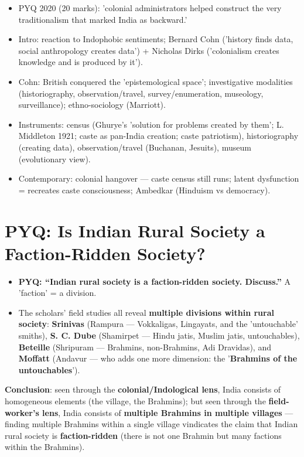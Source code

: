 \begin{QuickRevision}
\begin{itemize}
\item PYQ 2020 (20 marks): 'colonial administrators helped construct the very traditionalism that marked India as backward.'
\item Intro: reaction to Indophobic sentiments; Bernard Cohn ('history finds data, social anthropology creates data') + Nicholas Dirks ('colonialism creates knowledge and is produced by it').
\item Cohn: British conquered the 'epistemological space'; investigative modalities (historiography, observation/travel, survey/enumeration, museology, surveillance); ethno-sociology (Marriott).
\item Instruments: census (Ghurye's 'solution for problems created by them'; L. Middleton 1921; caste as pan-India creation; caste patriotism), historiography (creating data), observation/travel (Buchanan, Jesuits), museum (evolutionary view).
\item Contemporary: colonial hangover --- caste census still runs; latent dysfunction = recreates caste consciousness; Ambedkar (Hinduism vs democracy).
\end{itemize}
\end{QuickRevision}

\section{PYQ: Is Indian Rural Society a Faction-Ridden Society?}

\begin{PYQLink}
\begin{itemize}
\item \textbf{PYQ: ``Indian rural society is a faction-ridden society. Discuss.''} A 'faction' = a division.
\item The scholars' field studies all reveal \textbf{multiple divisions within rural society}: \textbf{Srinivas} (Rampura --- Vokkaligas, Lingayats, and the 'untouchable' smiths), \textbf{S. C. Dube} (Shamirpet --- Hindu jatis, Muslim jatis, untouchables), \textbf{Beteille} (Shripuram --- Brahmins, non-Brahmins, Adi Dravidas), and \textbf{Moffatt} (Andavur --- who adds one more dimension: the '\textbf{Brahmins of the untouchables}').
\end{itemize}
\end{PYQLink}

\begin{KeyConcept}
\textbf{Conclusion}: seen through the \textbf{colonial/Indological lens}, India consists of homogeneous elements (the village, the Brahmins); but seen through the \textbf{field-worker's lens}, India consists of \textbf{multiple Brahmins in multiple villages} --- finding multiple Brahmins within a single village vindicates the claim that Indian rural society is \textbf{faction-ridden} (there is not one Brahmin but many factions within the Brahmins).
\end{KeyConcept}

